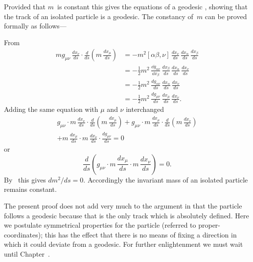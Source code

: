 \documentclass[12pt]{book}
\begin{document}
Provided that $m$~is constant this gives the equations of a geodesic ,
showing that the track of an isolated particle is a geodesic. The constancy of~$m$
can be proved formally as follows---

From~
\begin{align*}
  mg_{\mu\nu}\, \frac{dx_{\nu}}{ds} \cdot \frac{d}{ds} \left(m\, \frac{dx_{\mu}}{ds}\right)
  &= -m^{2} [\alpha\beta, \nu]\, \frac{dx_{\nu}}{ds}\, \frac{dx_{\alpha}}{ds}\, \frac{dx_{\beta}}{ds} \\
  &= -\tfrac{1}{2} m^{2} \, \frac{\dd g_{\alpha\nu}}{\dd x_{\beta}}\, \frac{dx_{\beta}}{ds}\, \frac{dx_{\alpha}}{ds}\, \frac{dx_{\nu}}{ds} \\
  &= -\tfrac{1}{2} m^{2} \, \frac{dg_{\alpha\nu}}{ds}\, \frac{dx_{\alpha}}{ds}\, \frac{dx_{\nu}}{ds} \\
  &= -\tfrac{1}{2} m^{2} \, \frac{dg_{\mu\nu}}{ds}\, \frac{dx_{\mu}}{ds}\, \frac{dx_{\nu}}{ds}.
\end{align*}
Adding the same equation with $\mu$ and $\nu$ interchanged
\begin{multline*}
g_{\mu\nu} \cdot m\, \frac{dx_{\nu}}{ds} \cdot \frac{d}{ds} \left(m\, \frac{dx_{\mu}}{ds}\right)
+ g_{\mu\nu} \cdot m\, \frac{dx_{\mu}}{ds} \cdot \frac{d}{ds} \left(m\, \frac{dx_{\nu}}{ds}\right) \\
+ m\, \frac{dx_{\mu}}{ds} \cdot m\, \frac{dx_{\nu}}{ds} \cdot \frac{dg_{\mu\nu}}{ds} = 0
\end{multline*}
or
\[
\frac{d}{ds} \left(g_{\mu\nu} \cdot m\, \frac{dx_{\mu}}{ds} \cdot m\, \frac{dx_{\nu}}{ds}\right) = 0.
\]
By~ this gives $dm^{2}/ds = 0$. Accordingly the invariant mass of an isolated
particle remains constant.

The present proof does not add very much to the argument in  that
the particle follows a geodesic because that is the only track which is absolutely
defined. Here we postulate symmetrical properties for the particle
(referred to proper-coordinates); this has the effect that there is no means of
fixing a direction in which it could deviate from a geodesic. For further
enlightenment we must wait until Chapter~\@.

%
%
%
\end{document}
